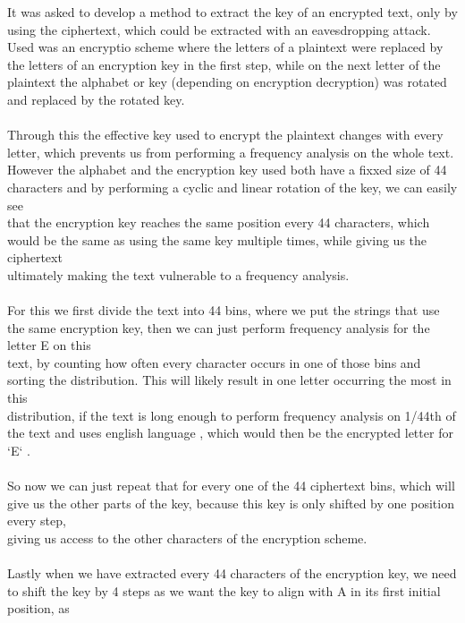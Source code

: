 \documentclass[12pt,a4paper]{article}
\begin{document}
It was asked to develop a method to extract the key of an encrypted text, only by using the ciphertext, which could be extracted with an eavesdropping attack. \\
Used was an encryptio scheme where the letters of a plaintext were replaced by the letters of an encryption key in the first step, while on the next letter of the \\
plaintext the alphabet or key (depending on encryption decryption) was rotated and replaced by the rotated key.\\\\
Through this the effective key used to encrypt the plaintext changes with every letter, which prevents us from performing a frequency analysis on the whole text.\\
However the alphabet and the encryption key used both have a fixxed size of 44 characters and by performing a cyclic and linear rotation of the key, we can easily see\\
that the encryption key reaches the same position every 44 characters, which would be the same as using the same key multiple times, while giving us the ciphertext\\
ultimately making the text vulnerable to a frequency analysis.\\\\
For this we first divide the text into 44 bins, where we put the strings that use the same encryption key, then we can just perform frequency analysis for the letter E on this \\
text, by counting how often every character occurs in one of those bins and sorting the distribution. This will likely result in one letter occurring the most in this\\
distribution, if the text is long enough to perform frequency analysis on 1/44th of the text and uses english language , which would then be the encrypted letter for `E` . \\
\\
So now we can just repeat that for every one of the 44 ciphertext bins, which will give us the other parts of the key, because this key is only shifted by one position every step,\\
giving us access to the other characters of the encryption scheme.\\
\\
Lastly when we have extracted every 44 characters of the encryption key, we need to shift the key by 4 steps as we want the key to align with A in its first initial position, as\\
\end{document}
